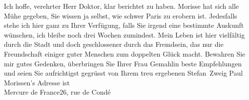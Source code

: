 \pstart
           Ich hoffe, verehrter Herr Doktor, klar berichtet zu haben. Morisse hat sich alle Mühe gegeben, Sie wissen ja selbst,
               wie schwer Paris zu erobern ist. Jedesfalls stehe
               ich hier ganz zu Ihrer Verfügung, falls Sie irgend eine bestimmte Aus{\pb}kunft wünschen, ich bleibe noch drei Wochen
                  zumindest. Mein Leben ist hier vielfältig
               durch die Stadt und doch
               geschlossener durch das Fremdsein, das nur die Freundschaft einiger guter Menschen
               zum doppelten Glück macht. Bewahren Sie mir gutes Gedenken, überbringen Sie Ihrer
               Frau Gemahlin beste
               Empfehlungen und seien Sie aufrichtigst gegrüsst von Ihrem treu ergebenen\pend
           \pstart \spacefill\mbox{Stefan Zweig}\pend{}
\pstart
           \noindent{}Paul Morissen’s Adresse ist{\\}Mercure de France26, rue de Condé\pend
           \endnumbering{}  \newcommand{\dateiname}{L03642}\newcommand{\titel}{Stefan Zweig an Arthur Schnitzler, 15. 3. 1913}\newcommand{\editorInnen}{Selma Jahnke und Martin Anton Müller}
